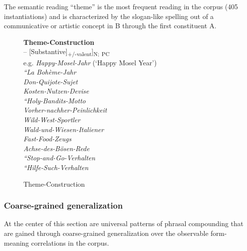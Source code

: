 \documentclass[output=paper]{LSP/langsci}
\begin{document}
The semantic reading ``theme'' is the most frequent reading in the corpus (405 instantiations) and is characterized by the slogan-like spelling out of a communicative or artistic concept in B through the first constituent A.

\begin{figure}
\caption{Theme-Construction\label{fig:hein:1.3}}
\begin{framed}\raggedright
\noindent \textbf{Theme-Construction}\\
\noindent [[Phrase\textsubscript{{}-CM}/Infinitive-coordinated/Verb Group\textsubscript{{}-CM} /Sentence\textsubscript{+Proper Name}] -- [Substantive]\textsubscript{+/-valent}]\textsubscript{N;} \textsubscript{PC}\\
\vspace{\baselineskip}
\noindent 
e.g. \textit{Happy-Mosel-Jahr} (‘Happy Mosel Year’)\\
\textit{``La Bohème{\textquotedbl}-Jahr}\\
\textit{Don-Quijote-Sujet}\\
\textit{Kosten-Nutzen-Devise}\\
\textit{``Holy-Bandits{\textquotedbl}-Motto}\\
\textit{Vorher-nachher-Peinlichkeit}\\
\textit{Wild-West-Sportler}\\
\textit{Wald-und-Wiesen-Italiener}\\
\textit{Fast-Food-Zeugs}\\
\textit{Achse-des-Bösen-Rede}\\
\textit{``Stop-and-Go{\textquotedbl}-Verhalten}\\
\textit{``Hilfe-Such-Verhalten{\textquotedbl}}
\end{framed}
\end{figure}

\subsubsection{Coarse-grained generalization}\label{sec:hein:3.1.2}
At the center of this section are universal patterns of phrasal compounding that are gained through coarse-grained generalization over the observable form-mean\-ing correlations in the corpus. 
\end{document}
